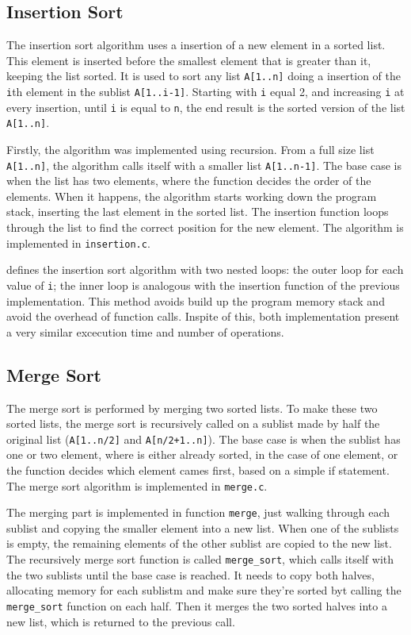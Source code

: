 \documentclass[a4paper,12pt,twocolumn]{article}
\begin{document}
\subsection{Insertion Sort}
\label{sec:insertion-sort}
The insertion sort algorithm uses a insertion of a new element in a sorted list. This element is inserted before the smallest element that is greater than it, keeping the list sorted. It is used to sort any list \verb|A[1..n]| doing a insertion of the \verb|i|th element in the sublist \verb|A[1..i-1]|. Starting with \verb|i| equal 2, and increasing \verb|i| at every insertion, until \verb|i| is equal to \verb|n|, the end result is the sorted version of the list \verb|A[1..n]|.

Firstly, the algorithm was implemented using recursion. From a full size list \verb|A[1..n]|, the algorithm calls itself with a smaller list \verb|A[1..n-1]|. The base case is when the list has two elements, where the function decides the order of the elements. When it happens, the algorithm starts working down the program stack, inserting the last element in the sorted list. The insertion function loops through the list to find the correct position for the new element. The algorithm is implemented in \verb|insertion.c|.

\textcite{cormenIntroductionAlgorithms2022} defines the insertion sort algorithm with two nested loops: the outer loop for each value of \verb|i|; the inner loop is analogous with the insertion function of the previous implementation. This method avoids build up the program memory stack and avoid the overhead of function calls. Inspite of this, both implementation present a very similar excecution time and number of operations.

\subsection{Merge Sort}
\label{sec:merge-sort}
The merge sort is performed by merging two sorted lists.
To make these two sorted lists, the merge sort is recursively called on a sublist made by half the original list (\verb|A[1..n/2]| and \verb|A[n/2+1..n]|).
The base case is when the sublist has one or two element, where is either already sorted, in the case of one element, or the function decides which element cames first, based on a simple if statement.
The merge sort algorithm is implemented in \verb|merge.c|.

The merging part is implemented in function \verb|merge|, just walking through each sublist and copying the smaller element into a new list.
When one of the sublists is empty, the remaining elements of the other sublist are copied to the new list.
The recursively merge sort function is called \verb|merge_sort|, which calls itself with the two sublists until the base case is reached.
It needs to copy both halves, allocating memory for each sublistm and make sure they're sorted byt calling the \verb|merge_sort| function on each half.
Then it merges the two sorted halves into a new list, which is returned to the previous call.
\end{document}
